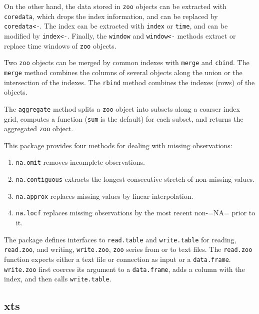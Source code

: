 \documentclass[smallroyalvopaper]{memoir}
\begin{document}
On the other hand, the data stored in \texttt{zoo} objects can be extracted with \texttt{coredata}, which drops the index information, and can be replaced by \texttt{coredata<-}. The index can be extracted with \texttt{index} or \texttt{time}, and can be modified by \texttt{index<-}. Finally, the \texttt{window} and \texttt{window<-} methods extract or replace time windows of \texttt{zoo} objects.

Two \texttt{zoo} objects can be merged by common indexes with \texttt{merge} and \texttt{cbind}. The \texttt{merge} method combines the columns of several objects along the union or the intersection of the indexes. The \texttt{rbind} method combines the indexes (rows) of the objects.

The \texttt{aggregate} method splits a \texttt{zoo} object into subsets along a coarser index grid, computes a function (\texttt{sum} is the default) for each subset, and returns the aggregated \texttt{zoo} object.

This package provides four methods for dealing with missing observations:

\begin{enumerate}
\item \texttt{na.omit} removes incomplete observations.

\item \texttt{na.contiguous} extracts the longest consecutive stretch of non-missing values.

\item \texttt{na.approx} replaces missing values by linear interpolation.

\item \texttt{na.locf} replaces missing observations by the most recent non-=NA= prior to it.
\end{enumerate}

The package defines interfaces to \texttt{read.table} and \texttt{write.table} for reading, \texttt{read.zoo}, and writing, \texttt{write.zoo}, \texttt{zoo} series from or to text files. The \texttt{read.zoo} function expects either a text file or connection as input or a \texttt{data.frame}. \texttt{write.zoo} first coerces its argument to a \texttt{data.frame}, adds a column with the index, and then calls \texttt{write.table}.

\subsection{xts}
\label{sec:orgheadline15}
\label{sec:xts}
\end{document}
